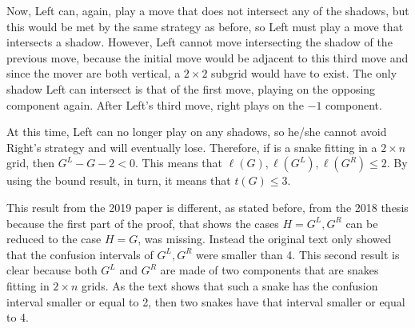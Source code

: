 Now, Left can, again, play a move that does not intersect any of the shadows, but this would be met by the same strategy as before, so Left must play a move that intersects a shadow. However, Left cannot move intersecting the shadow of the previous move, because the initial move would be adjacent to this third move and since the mover are both vertical, a $2\times 2$ subgrid would have to exist. The only shadow Left can intersect is that of the first move, playing on the opposing component again. After Left's third move, right plays on the $-1$ component.

At this time, Left can no longer play on any shadows, so he/she cannot avoid Right's strategy and will eventually lose. Therefore, if \Gm{} is a snake fitting in a $2\times n$ grid, then $G^L - G -2 < 0$. This means that $\ell(G),\ell(G^L),\ell(G^R) \leq 2$. By using the bound result, in turn, it means that $t(G) \leq 3$. 

This result from the 2019 paper is different, as stated before, from the 2018 thesis because the first part of the proof, that shows the cases $H=G^L,G^R$ can be reduced to the case $H=G$, was missing. Instead the original text only showed that the confusion intervals of $G^L,G^R$ were smaller than 4. This second result is clear because both $G^L$ and $G^R$ are made of two components that are snakes fitting in $2\times n$ grids. As the text shows that such a snake has the confusion interval smaller or equal to 2, then two snakes have that interval smaller or equal to 4.















